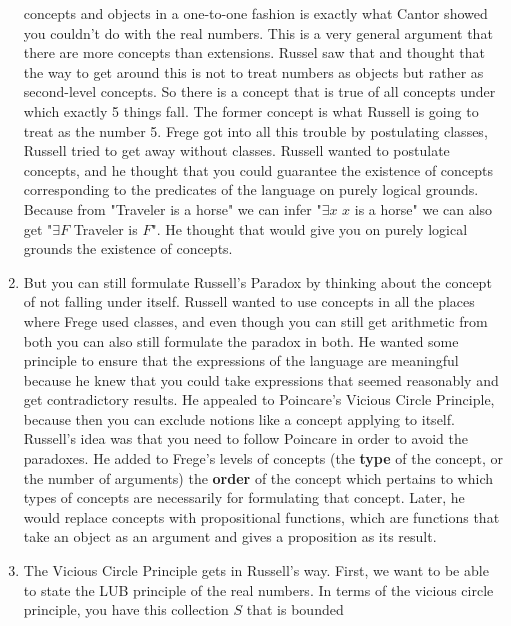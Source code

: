 \documentclass[12pt]{article}
\theoremstyle{definition}
\begin{document}
\begin{enumerate}
        concepts and objects in a one-to-one fashion is exactly what Cantor
        showed you couldn't do with the real numbers. This is a very general
        argument that there are more concepts than extensions. Russel saw that
        and thought that the way to get around this is not to treat numbers as
        objects but rather as second-level concepts. So there is a concept that
        is true of all concepts under which exactly 5 things fall. The former
        concept is what Russell is going to treat as the number 5. Frege got
        into all this trouble by postulating classes, Russell tried to get away
        without classes. Russell wanted to postulate concepts, and he thought
        that you could guarantee the existence of concepts corresponding to the
        predicates of the language on purely logical grounds. Because from
        "Traveler is a horse" we can infer "$\exists x$ $x$ is a horse" we can
        also get "$\exists F$ Traveler is $F$". He thought that would give you
        on purely logical grounds the existence of concepts.
    \item
        But you can still formulate Russell's Paradox by thinking about the
        concept of not falling under itself. Russell wanted to use concepts in
        all the places where Frege used classes, and even though you can still
        get arithmetic from both you can also still formulate the paradox in
        both. He wanted some principle to ensure that the expressions of the
        language are meaningful because he knew that you could take expressions
        that seemed reasonably and get contradictory results. He appealed to
        Poincare's Vicious Circle Principle, because then you can exclude
        notions like a concept applying to itself. Russell's idea was that you
        need to follow Poincare in order to avoid the paradoxes. He added to
        Frege's levels of concepts (the \textbf{type} of the concept, or the
        number of arguments) the \textbf{order} of the concept which pertains
        to which types of concepts are necessarily for formulating that
        concept. Later, he would replace concepts with propositional functions,
        which are functions that take an object as an argument and gives a
        proposition as its result.
    \item
        The Vicious Circle Principle gets in Russell's way. First, we want to
        be able to state the LUB principle of the real numbers. In terms of the
        vicious circle principle, you have this collection $S$ that is bounded

\end{enumerate}
\end{document}
